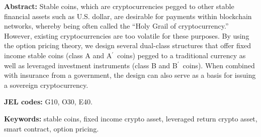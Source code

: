 \documentclass[11pt]{article}%
\numberwithin{equation}{section}
\theoremstyle{plain}
\newcommand{\Ap}{A\ensuremath{^\prime}~}
\newcommand{\Bp}{B\ensuremath{^\prime}~}
\begin{document}
\date{\vspace{-5ex}}
\maketitle


\indent\textbf{Abstract:}
Stable coins, which are cryptocurrencies pegged to other stable financial assets such as U.S. dollar, are desirable for payments within blockchain networks, whereby being often called the ``Holy Grail of cryptocurrency.'' However, existing cryptocurrencies are too volatile for these purposes. By using the option pricing theory, we design several dual-class structures that offer fixed income stable coins (class A and \Ap coins) pegged to a traditional currency as well as leveraged investment instruments (class B and \Bp coins). When combined with insurance from a government, the design can also serve as a basis for issuing a sovereign cryptocurrency.



\vspace{0.1in}\indent\textbf{JEL codes:}  G10, O30, E40.

\vspace{0.1in}\indent\textbf{Keywords:}
stable coins, fixed income crypto asset, leveraged return crypto asset, smart contract, option pricing.

\clearpage


\end{document}
